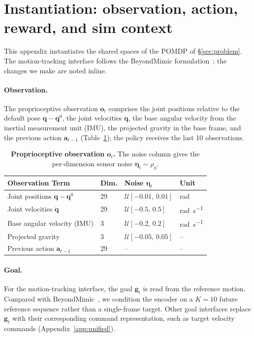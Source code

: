 
\section{Instantiation: observation, action, reward, and sim context}
\label{app:spaces}

This appendix instantiates the shared spaces of the POMDP of \S\ref{sec:problem}. The motion-tracking interface follows the BeyondMimic formulation~\citep{liao2025beyondmimic}; the changes we make are noted inline.

\paragraph{Observation.}
The proprioceptive observation $\bm{o}_t$ comprises the joint positions relative to the default pose $\bm{q} - \bm{q}^0$, the joint velocities $\dot{\bm{q}}$, the base angular velocity from the inertial measurement unit (IMU), the projected gravity in the base frame, and the previous action $\bm{a}_{t-1}$ (Table~\ref{tab:obs-supermimic}); the policy receives the last 10 observations.

\begin{table}[!htbp]
\centering
\footnotesize
\setlength{\tabcolsep}{3pt}
\begin{tabular}{@{}llll@{}}
\toprule
\textbf{Observation Term} & \textbf{Dim.} & \textbf{Noise $\bm{\eta}_t$} & \textbf{Unit} \\
\midrule
Joint positions $\bm{q} - \bm{q}^0$ & 29 & $\mathcal{U}[-0.01,\,0.01]$ & \unit{\radian} \\
Joint velocities $\dot{\bm{q}}$ & 29 & $\mathcal{U}[-0.5,\,0.5]$ & \unit{\radian\per\second} \\
Base angular velocity (IMU) & 3 & $\mathcal{U}[-0.2,\,0.2]$ & \unit{\radian\per\second} \\
Projected gravity & 3 & $\mathcal{U}[-0.05,\,0.05]$ & -- \\
Previous action $\bm{a}_{t-1}$ & 29 & -- & -- \\
\bottomrule
\end{tabular}
\vspace{0.6em}
\caption{\textbf{Proprioceptive observation $\bm{o}_t$.} The noise column gives the per-dimension sensor noise $\bm{\eta}_t \sim \rho_\eta$.}
\label{tab:obs-supermimic}
\end{table}

\paragraph{Goal.}
For the motion-tracking interface, the goal $\bm{g}_t$ is read from the reference motion. 
Compared with BeyondMimic~\citep{liao2025beyondmimic}, we condition the encoder on a $K=10$ future reference sequence rather than a single-frame target. 
Other goal interfaces replace $\bm{g}_t$ with their corresponding command representation, such as target velocity commands (Appendix~\ref{app:unified}).

